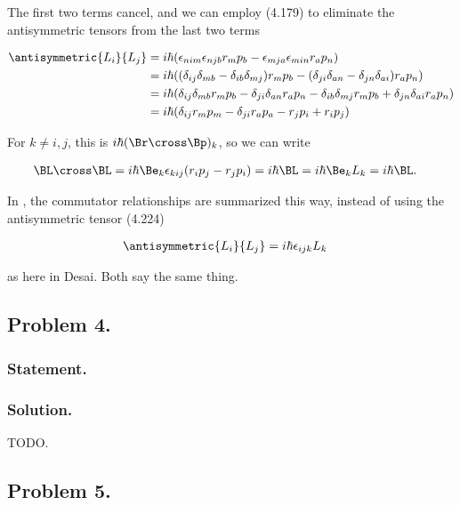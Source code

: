 The first two terms cancel, and we can employ (4.179) to eliminate the antisymmetric tensors from the last two terms

\begin{align*}
\antisymmetric{L_i}{L_j}
&=
i \hbar ( \epsilon_{nim} \epsilon_{njb} r_m p_b - \epsilon_{mja} \epsilon_{min} r_a p_n ) \\
&=
i \hbar ( (\delta_{ij} \delta_{mb} -\delta_{ib} \delta_{mj}) r_m p_b - (\delta_{ji} \delta_{an} -\delta_{jn} \delta_{ai}) r_a p_n ) \\
&=
i \hbar (\delta_{ij} \delta_{mb} r_m p_b - \delta_{ji} \delta_{an} r_a p_n - \delta_{ib} \delta_{mj} r_m p_b + \delta_{jn} \delta_{ai} r_a p_n ) \\
&=
i \hbar (
\delta_{ij} r_m p_m
- \delta_{ji} r_a p_a
- r_j p_i
+ r_i p_j ) \\
\end{align*}

For $k \ne i,j$, this is $i\hbar (\Br \cross \Bp)_k$, so we can write

\begin{align}\label{eqn:desaiCh4:301}
\BL \cross \BL &= i\hbar \Be_k \epsilon_{kij} ( r_i p_j - r_j p_i ) = i\hbar \BL = i\hbar \Be_k L_k = i\hbar \BL.
\end{align}

In \cite{liboff2003iqm}, the commutator relationships are summarized this way, instead of using the antisymmetric tensor (4.224)

\begin{align}\label{eqn:desaiCh4:302}
\antisymmetric{L_i}{L_j} &= i \hbar \epsilon_{ijk} L_k
\end{align}

as here in Desai.  Both say the same thing.

\subsection{Problem 4.}
\subsubsection{Statement.}
\subsubsection{Solution.}

TODO.
\subsection{Problem 5.}
